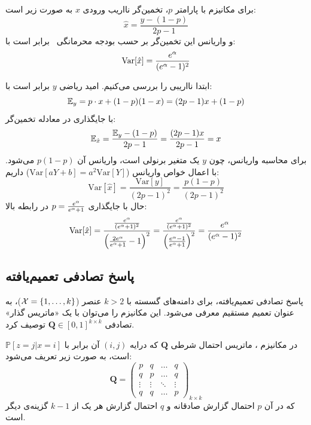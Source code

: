 \begin{لم}
\label{lem:rr-variance}
برای مکانیزم  با پارامتر $p$، تخمین‌گر نااریب ورودی $x$ به صورت زیر است:
\begin{equation}
\hat{x} = \frac{y - (1-p)}{2p - 1}
\end{equation}
و واریانس این تخمین‌گر بر حسب بودجه محرمانگی \al \ برابر است با:
\begin{equation}
\mathrm{Var}[\hat{x}] = \frac{e^{\alpha}}{(e^{\alpha} - 1)^2}
\end{equation}
\end{لم}

\begin{اثبات}
ابتدا نااریبی را بررسی می‌کنیم. امید ریاضی $y$ برابر است با:
\[\Eset[y] = p \cdot x + (1-p)(1-x) = (2p-1)x + (1-p)\]
با جایگذاری در معادله تخمین‌گر:
\[
\Eset[\hat{x}] = \frac{\Eset[y] - (1-p)}{2p - 1} = \frac{(2p-1)x}{2p-1} = x
\]
برای محاسبه واریانس، چون $y$ یک متغیر برنولی است، واریانس آن $p(1-p)$ می‌شود. با اعمال خواص واریانس ($\mathrm{Var}[aY+b] = a^2\mathrm{Var}[Y]$) داریم:
\[
\mathrm{Var}[\hat{x}] = \frac{\mathrm{Var}[y]}{(2p-1)^2} = \frac{p(1-p)}{(2p-1)^2}
\]
حال با جایگذاری $p = \frac{e^{\alpha}}{e^{\alpha}+1}$ در رابطه بالا:
\[
\mathrm{Var}[\hat{x}] = \frac{\frac{e^{\alpha}}{(e^{\alpha}+1)^2}}{\left(\frac{2e^{\alpha}}{e^{\alpha}+1} - 1\right)^2} = \frac{\frac{e^{\alpha}}{(e^{\alpha}+1)^2}}{\left(\frac{e^{\alpha}-1}{e^{\alpha}+1}\right)^2} = \frac{e^{\alpha}}{(e^{\alpha}-1)^2}
\]
\end{اثبات}

\subsection{پاسخ تصادفی تعمیم‌یافته }
\label{sec:ldp:grr}
پاسخ تصادفی تعمیم‌یافته،
برای دامنه‌های گسسته با $k > 2$ عنصر ($\Xset = \{1, \dots, k\}$)، به عنوان تعمیم مستقیم  معرفی می‌شود. این مکانیزم را می‌توان با یک «ماتریس گذار» تصادفی $\mathbf{Q} \in [0,1]^{k \times k}$ توصیف کرد.

\begin{تعریف}
در مکانیزم ، ماتریس احتمال شرطی $\mathbf{Q}$ که درایه $(i,j)$ آن برابر با $\mathbb{P}\left[z=j | x=i\right]$ است، به صورت زیر تعریف می‌شود:
\begin{equation}
\mathbf{Q} = 
\begin{pmatrix}
p & q & \dots & q \\
q & p & \dots & q \\
\vdots & \vdots & \ddots & \vdots \\
q & q & \dots & p
\end{pmatrix}_{k \times k}
\end{equation}
که در آن $p$ احتمال گزارش صادقانه و $q$ احتمال گزارش هر یک از $k-1$ گزینه‌ی دیگر است.
\end{تعریف}

